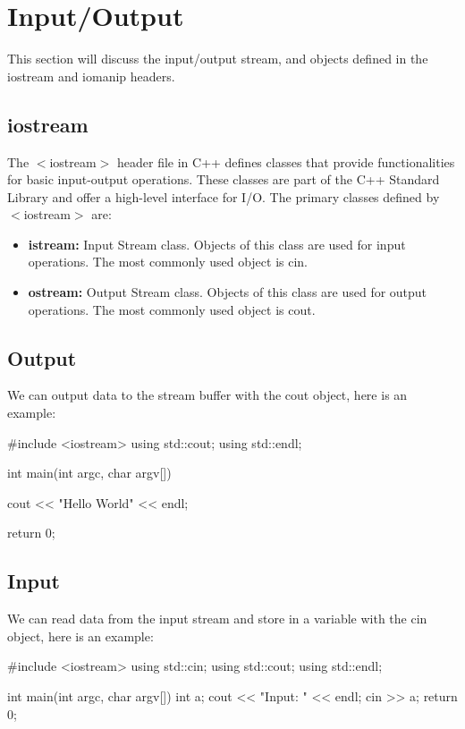 \documentclass{report}
\begin{document}
    \section{\LARGE Input/Output}
    \bigbreak \noindent 
    This section will discuss the input/output stream, and objects defined in the iostream and iomanip headers.
    \bigbreak \noindent 
    \subsection{iostream}
    \bigbreak \noindent 
    The $<$iostream$>$ header file in C++ defines classes that provide functionalities for basic input-output operations. These classes are part of the C++ Standard Library and offer a high-level interface for I/O. The primary classes defined by $<$iostream$>$ are:
    \begin{itemize}
        \item \textbf{istream:} Input Stream class. Objects of this class are used for input operations. The most commonly used object is cin.
        \item \textbf{ostream:} Output Stream class. Objects of this class are used for output operations. The most commonly used object is cout.
    \end{itemize}
    \bigbreak \noindent 
    \subsection{Output}
    \bigbreak \noindent 
    We can output data to the stream buffer with the cout object, here is an example:
    \bigbreak \noindent 
    
    \begin{cppcode}
#include <iostream>
using std::cout;
using std::endl;

int main(int argc, char argv[]){

    cout << "Hello World" << endl;

    return 0;
}
    \end{cppcode}
    
    \bigbreak \noindent 
    \subsection{Input}
    \bigbreak \noindent 
    We can read data from the input stream and store in a variable with the cin object, here is an example:
    \bigbreak \noindent 
    
    \begin{cppcode}
#include <iostream>
using std::cin;
using std::cout;
using std::endl;

int main(int argc, char argv[]){
    int a;
    cout << "Input: " << endl;
    cin >> a;
    return 0;
}

    \end{cppcode}
    
\end{document}
